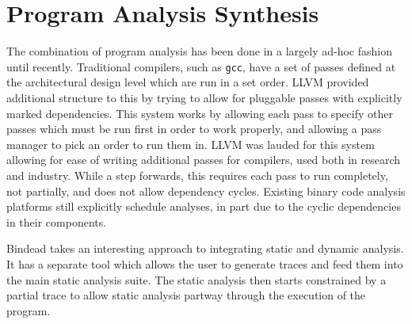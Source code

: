 \section{Program Analysis Synthesis}
The combination of program analysis has been done in a largely ad-hoc fashion until recently.
Traditional compilers, such as \texttt{gcc}, have a set of passes defined at the architectural design level which are run in a set order.
LLVM\cite{llvm} provided additional structure to this by trying to allow for pluggable passes with explicitly marked dependencies.
This system works by allowing each pass to specify other passes which must be run first in order to work properly, and allowing a pass manager to pick an order to run them in.
LLVM was lauded for this system allowing for ease of writing additional passes for compilers, used both in research and industry.
While a step forwards, this requires each pass to run completely, not partially, and does not allow dependency cycles.
Existing binary code analysis platforms\cite{jakstab,bap,codesurfer,bitblaze,boomerang,bindead,ida} still explicitly schedule analyses, in part due to the cyclic dependencies in their components.

Bindead\cite{bindead} takes an interesting approach to integrating static and dynamic analysis.
It has a separate tool which allows the user to generate traces and feed them into the main static analysis suite.
The static analysis then starts constrained by a partial trace to allow static analysis partway through the execution of the program.
